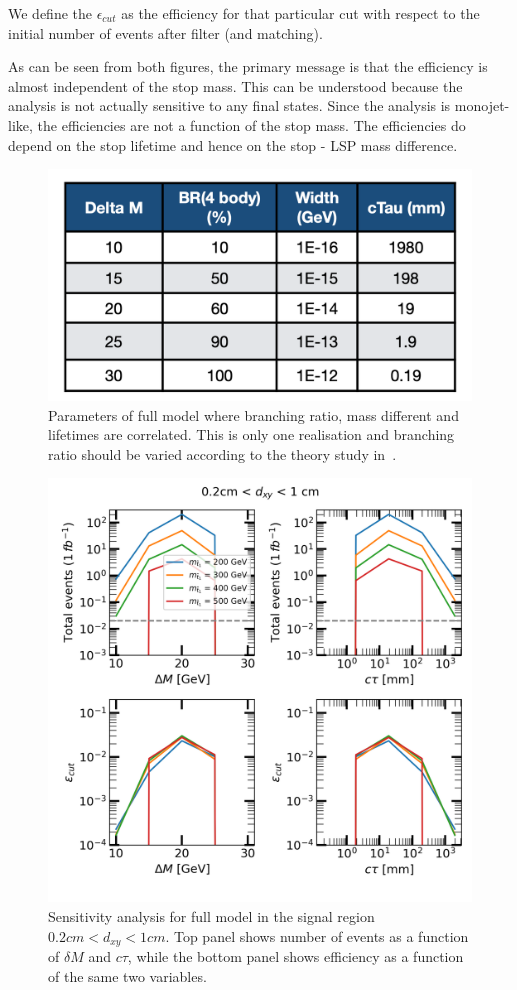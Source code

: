 \documentclass[prd,reprint,nofootinbib,notitlepage,aps,tightenlines,amsmath,amssymb,showpacs,superscriptaddress]{revtex4-1}
\begin{document}
We define the $\epsilon_{cut}$ as the efficiency for that particular cut with respect to the initial number of events after filter (and matching).

As can be seen from both figures, the primary message is that the efficiency is almost independent of the stop mass. This can be understood because the analysis is not actually sensitive to any final states. Since the analysis is monojet-like, the efficiencies are not a function of the stop mass. The efficiencies do depend on the stop lifetime and hence on the stop - LSP mass difference. 
\begin{figure}[tb]
  \includegraphics[width=0.7\columnwidth]{./figures/proposed_grid.png}%
 \caption{Parameters of full model where branching ratio, mass different and lifetimes are correlated. This is only one realisation and branching ratio should be varied according to the theory study in~\cite{Grober:2014aha}.}
\label{fig:prop_grid}
\end{figure}

\begin{figure}[tb]
  \includegraphics[width=0.8\columnwidth]{./figures/02_dxy_1_full_grid.png}%
 \caption{Sensitivity analysis for full model in the signal region $0.2 cm < d_{xy} < 1 cm$. Top panel shows number of events as a function of $\delta M$ and $c\tau$, while the bottom panel shows efficiency as a function of the same two variables.}
\label{fig:full_grid_dxy02}
\end{figure}
\end{document}
